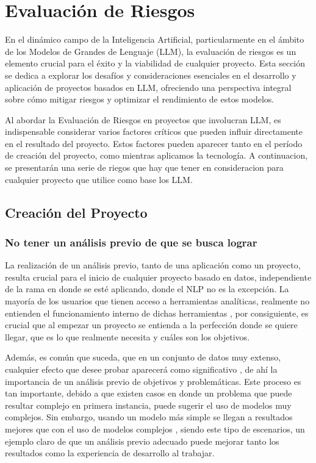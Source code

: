 
\chapter{Evaluación de Riesgos}

En el dinámico campo de la Inteligencia Artificial, particularmente en el ámbito de los Modelos de Grandes de Lenguaje (LLM), 
la evaluación de riesgos es un elemento crucial para el éxito y la viabilidad de cualquier proyecto. Esta sección se dedica 
a explorar los desafíos y consideraciones esenciales en el desarrollo y aplicación de proyectos basados en LLM, ofreciendo 
una perspectiva integral sobre cómo mitigar riesgos y optimizar el rendimiento de estos modelos.

Al abordar la Evaluación de Riesgos en proyectos que involucran LLM, es indispensable considerar varios factores críticos 
que pueden influir directamente en el resultado del proyecto. Estos factores pueden aparecer tanto en el período de creación
del proyecto, como mientras aplicamos la tecnología. A continuacion, se presentarán una serie de riegos que hay que tener en 
consideracion para cualquier proyecto que utilice como base los LLM.

\section{Creación del Proyecto}

\subsection{No tener un análisis previo de que se busca lograr}

La realización de un análisis previo, tanto de una aplicación como un proyecto, resulta crucial para el inicio de cualquier 
proyecto basado en datos, independiente de la rama en donde se esté aplicando, donde el NLP no es la excepción. 
La mayoría de los usuarios que tienen acceso a herramientas analíticas, realmente no entienden el funcionamiento interno de dichas herramientas \cite{datos1}, 
por consiguiente, es crucial que al empezar un proyecto se entienda a la perfección donde se quiere llegar, que es lo que realmente necesita y cuáles son los objetivos. 

Además, es común que suceda, que en un conjunto de datos muy extenso, cualquier efecto que desee probar aparecerá como significativo \cite{datos1}, de ahí la 
importancia de un análisis previo de objetivos y problemáticas. Este proceso es tan importante, debido a que existen casos en donde un problema que puede resultar complejo en 
primera instancia, puede sugerir el uso de modelos muy complejos. Sin embargo, usando un modelo más simple se llegan a resultados mejores 
que con el uso de modelos complejos \cite{datos2}, siendo este tipo de escenarios, un ejemplo claro de que un análisis previo adecuado puede mejorar tanto los resultados como la 
experiencia de desarrollo al trabajar. 

